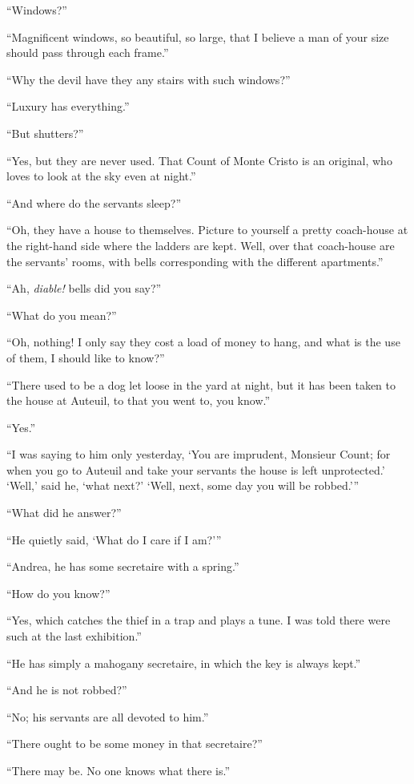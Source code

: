 “Windows?”

“Magnificent windows, so beautiful, so large, that I believe a man of
your size should pass through each frame.”

“Why the devil have they any stairs with such windows?”

“Luxury has everything.”

“But shutters?”

“Yes, but they are never used. That Count of Monte Cristo is an
original, who loves to look at the sky even at night.”

“And where do the servants sleep?”

“Oh, they have a house to themselves. Picture to yourself a pretty
coach-house at the right-hand side where the ladders are kept. Well,
over that coach-house are the servants’ rooms, with bells corresponding
with the different apartments.”

“Ah, \textit{diable!} bells did you say?”

“What do you mean?”

“Oh, nothing! I only say they cost a load of money to hang, and what is
the use of them, I should like to know?”

“There used to be a dog let loose in the yard at night, but it has been
taken to the house at Auteuil, to that you went to, you know.”

“Yes.”

“I was saying to him only yesterday, ‘You are imprudent, Monsieur
Count; for when you go to Auteuil and take your servants the house is
left unprotected.’ ‘Well,’ said he, ‘what next?’ ‘Well, next, some day
you will be robbed.’”

“What did he answer?”

“He quietly said, ‘What do I care if I am?’”

“Andrea, he has some secretaire with a spring.”

“How do you know?”

“Yes, which catches the thief in a trap and plays a tune. I was told
there were such at the last exhibition.”

“He has simply a mahogany secretaire, in which the key is always kept.”

“And he is not robbed?”

“No; his servants are all devoted to him.”

“There ought to be some money in that secretaire?”

“There may be. No one knows what there is.”


